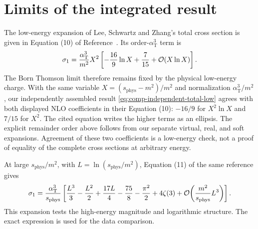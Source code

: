 \section{Limits of the integrated result}
The low-energy expansion of Lee, Schwartz and Zhang's total cross
section is given in Equation (10) of Reference~\cite{qed-processes-lsz}.
Its order-$\alpha_{\mathrm T}^3$ term is
\begin{equation}
 \sigma_1=\frac{\alpha_{\mathrm T}^3}{m^2}X^2
 \left[-\frac{16}{9}\ln X+\frac7{15}+\mathcal{O}(X\ln X)\right].
\end{equation}
The Born Thomson limit therefore remains fixed by the physical
low-energy charge. With the same variable $X=(s_{\mathrm{phys}}-m^2)/m^2$ and
normalization $\alpha_{\mathrm T}^3/m^2$, our independently assembled
result \eqref{eq:comp-independent-total-low} agrees with both displayed
NLO coefficients in their Equation (10): $-16/9$ for $X^2\ln X$
and $7/15$ for $X^2$. The cited equation writes the higher terms as
an ellipsis. The explicit remainder order above follows from our
separate virtual, real, and soft expansions. Agreement of these two
coefficients is a low-energy check, not a proof of equality of the
complete cross sections at arbitrary energy.

At large $s_{\mathrm{phys}}/m^2$, with $L=\ln(s_{\mathrm{phys}}/m^2)$,
Equation (11) of the same reference gives
\begin{equation}
 \sigma_1=\frac{\alpha_{\mathrm T}^3}{s_{\mathrm{phys}}}
 \left[\frac{L^3}3-\frac{L^2}2+\frac{17L}4
                  -\frac{75}8-\frac{\pi^2}2+4\zeta(3)
                  +\mathcal{O}\!\left(\frac{m^2}{s_{\mathrm{phys}}}L^3\right)\right].
\end{equation}
This expansion tests the high-energy magnitude and logarithmic
structure. The exact expression is used for the data comparison.
